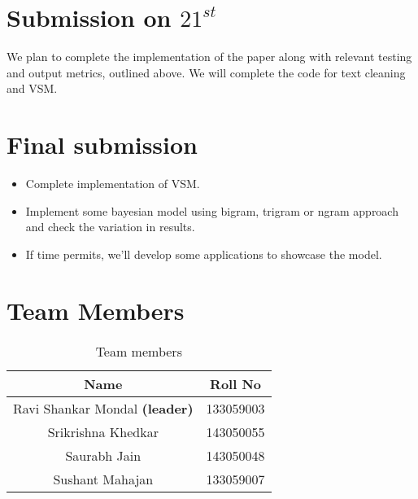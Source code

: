 \section{Submission on $21^{st}$}
We plan to complete the implementation of the paper along with relevant testing and output metrics, outlined above. We will complete the code for text cleaning and VSM.
\section{Final submission}
\begin{itemize}
\item Complete implementation of VSM.
\item Implement some bayesian model using bigram, trigram or ngram approach and check the variation in results.
\item If time permits, we'll develop some applications to showcase the model.
\end{itemize}
\section{Team Members}
\begin{table}[ht!]
\centering
\label{tab-team-members}
\begin{tabular}{c|c}
\textbf{Name} & \textbf{Roll No} \\
\hline
Ravi Shankar Mondal \textbf{(leader)}& 133059003 \\
Srikrishna Khedkar & 143050055 \\
Saurabh Jain & 143050048 \\
Sushant Mahajan & 133059007
\end{tabular}
\caption{Team members}
\end{table}

